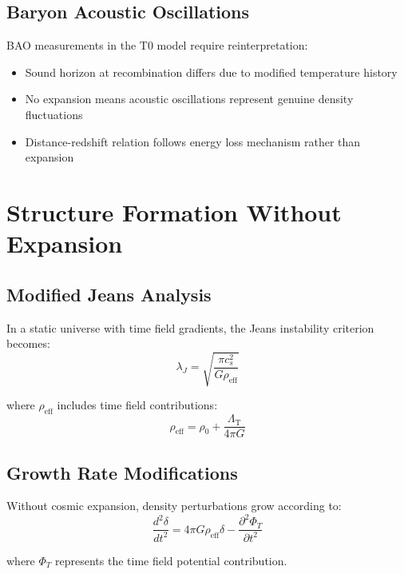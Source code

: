 \documentclass[12pt,a4paper]{article}
\newcommand{\LambdaT}{\Lambda_{\text{T}}}
\begin{document}
	\subsection{Baryon Acoustic Oscillations}
	\label{subsec:bao}
	
	BAO measurements in the T0 model require reinterpretation:
	\begin{itemize}
		\item Sound horizon at recombination differs due to modified temperature history
		\item No expansion means acoustic oscillations represent genuine density fluctuations
		\item Distance-redshift relation follows energy loss mechanism rather than expansion
	\end{itemize}
	
	\section{Structure Formation Without Expansion}
	\label{sec:structure_formation}
	
	\subsection{Modified Jeans Analysis}
	\label{subsec:jeans_analysis}
	
	In a static universe with time field gradients, the Jeans instability criterion becomes:
	\begin{equation}
		\lambda_J = \sqrt{\frac{\pi c_s^2}{G \rho_{\text{eff}}}}
	\end{equation}
	
	where $\rho_{\text{eff}}$ includes time field contributions:
	\begin{equation}
		\rho_{\text{eff}} = \rho_0 + \frac{\LambdaT}{4\pi G}
	\end{equation}
	
	\subsection{Growth Rate Modifications}
	\label{subsec:growth_modifications}
	
	Without cosmic expansion, density perturbations grow according to:
	\begin{equation}
		\frac{d^2 \delta}{dt^2} = 4\pi G \rho_{\text{eff}} \delta - \frac{\partial^2 \Phi_T}{\partial t^2}
	\end{equation}
	
	where $\Phi_T$ represents the time field potential contribution.
	
\end{document}
